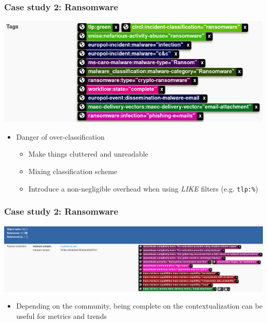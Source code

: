 \begin{frame}
    \frametitle{Case study 2: Ransomware}
    \includegraphics[width=1.0\linewidth]{pictures/case2/event-tags.png}
    \vspace{0.25cm}
    \begin{itemize}
        \item Danger of over-classification
        \begin{itemize}
            \item Make things cluttered and unreadable
            \item Mixing classification scheme
            \item Introduce a non-negligible overhead when using \textit{LIKE} filters (e.g. \texttt{tlp:\%})
        \end{itemize}
    \end{itemize}
\end{frame}

\begin{frame}
    \frametitle{Case study 2: Ransomware}
    \includegraphics[width=1.0\linewidth]{pictures/case2/attribute-tags1.png}
    \vspace{0.25cm}
    \begin{itemize}
        \item Depending on the community, being complete on the contextualization can be useful for metrics and trends
    \end{itemize}
\end{frame}

